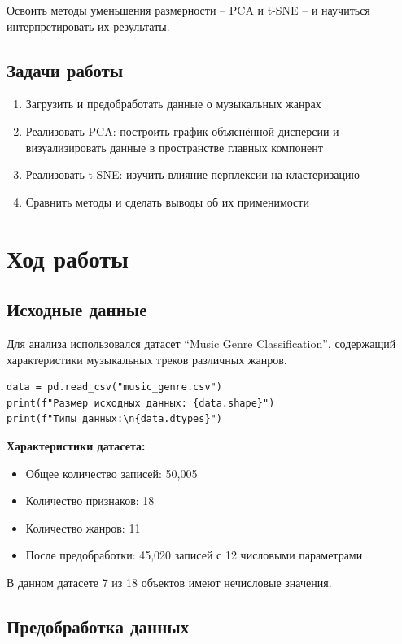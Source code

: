 \documentclass[12pt,a4paper]{report}
\begin{document}
Освоить методы уменьшения размерности -- PCA и t-SNE -- и научиться интерпретировать их результаты.

\section{Задачи работы}

\begin{enumerate}
    \item Загрузить и предобработать данные о музыкальных жанрах
    \item Реализовать PCA: построить график объяснённой дисперсии и визуализировать данные в пространстве главных компонент
    \item Реализовать t-SNE: изучить влияние перплексии на кластеризацию
    \item Сравнить методы и сделать выводы об их применимости
\end{enumerate}

\chapter{Ход работы}

\section{Исходные данные}

Для анализа использовался датасет ``Music Genre Classification'', содержащий характеристики музыкальных треков различных жанров.

\begin{lstlisting}
data = pd.read_csv("music_genre.csv")
print(f"Размер исходных данных: {data.shape}")
print(f"Типы данных:\n{data.dtypes}")
\end{lstlisting}

\textbf{Характеристики датасета:}
\begin{itemize}
    \item Общее количество записей: 50,005
    \item Количество признаков: 18
    \item Количество жанров: 11
    \item После предобработки: 45,020 записей с 12 числовыми параметрами
\end{itemize}

В данном датасете 7 из 18 объектов имеют нечисловые значения.

\section{Предобработка данных}
\end{document}
